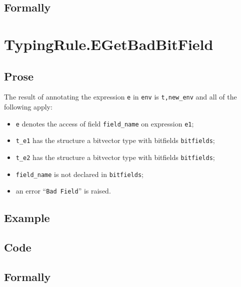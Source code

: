 \documentclass{book}
\begin{document}
\begin{emptyformal}
    \subsection{Formally}
\end{emptyformal}


\section{TypingRule.EGetBadBitField \label{sec:TypingRule.EGetBadBitField}}

  \subsection{Prose}
  The result of annotating the expression \texttt{e} in \texttt{env} is
\texttt{t,new\_env} and all of the following apply:
  \begin{itemize}
  \item \texttt{e} denotes the access of field \texttt{field\_name} on expression \texttt{e1};
  \item \texttt{t\_e1} has the structure a bitvector type with bitfields \texttt{bitfields};
  \item \texttt{t\_e2} has the structure a bitvector type with bitfields \texttt{bitfields};
  \item \texttt{field\_name} is not declared in \texttt{bitfields};
  \item an error ``\texttt{Bad Field}'' is raised.
  \end{itemize}

  \subsection{Example}

  \subsection{Code}

\begin{emptyformal}
    \subsection{Formally}
\end{emptyformal}
\end{document}
